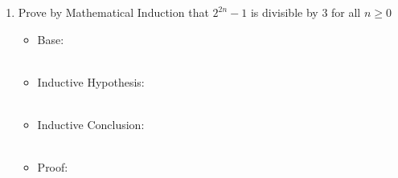 \begin{enumerate}
    \item Prove by Mathematical Induction that $2^{2n}-1$ is divisible by $3$ for all $n \ge 0$
    \begin{itemize}
    \item Base:\\ \\
    \item Inductive Hypothesis: \\ \\
    \item Inductive Conclusion: \\ \\
    \item Proof:\\ \\
    \end{itemize}
    
    \end{enumerate}
    
    
    